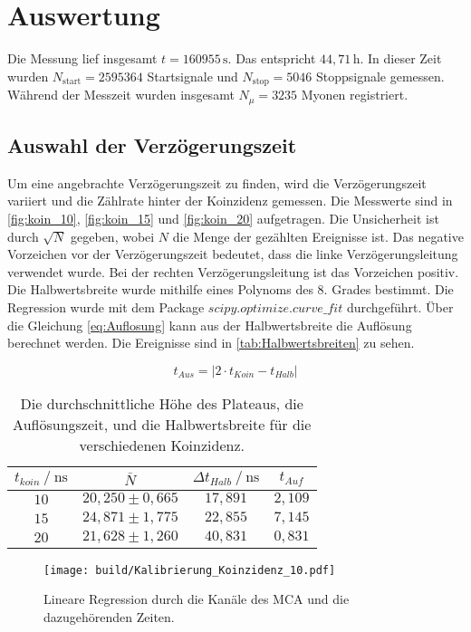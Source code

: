 \section{Auswertung}
\label{sec:auswertung}


Die Messung lief insgesamt $t = 160955 \, \unit{\second}$. Das entspricht $44,71 \, \unit{\hour}$. In dieser Zeit wurden $N_\text{start} = 2595364$ Startsignale und $N_\text{stop} = 5046$ Stoppsignale gemessen.
Während der Messzeit wurden insgesamt $N_{\mu} = 3235 $ Myonen registriert.

\subsection{Auswahl der Verzögerungszeit}
\label{sec:Verzögerungszeit}
Um eine angebrachte Verzögerungszeit zu finden, wird die Verzögerungszeit variiert und die Zählrate hinter der Koinzidenz gemessen.
Die Messwerte sind in \autoref{fig:koin_10}, \autoref{fig:koin_15} und \autoref{fig:koin_20} aufgetragen. Die Unsicherheit ist durch $ \sqrt{N}$ gegeben, wobei $N$ die Menge der gezählten Ereignisse ist.
Das negative Vorzeichen vor der Verzögerungszeit bedeutet, dass die linke Verzögerungsleitung verwendet wurde. Bei der rechten Verzögerungsleitung ist das Vorzeichen positiv.
Die Halbwertsbreite wurde mithilfe eines Polynoms des 8. Grades bestimmt. Die Regression wurde mit dem Package $scipy.optimize.curve\_ fit $  \cite{scipyop} durchgeführt.
Über die Gleichung \eqref{eq:Auflosung} kann aus der Halbwertsbreite die Auflösung berechnet werden. Die Ereignisse sind in \autoref{tab:Halbwertsbreiten} zu sehen.

\begin{equation}
    t_{Aus} = \left|2 \cdot t_{Koin} - t_{Halb} \right|
    \label{eq:Auflosung}
\end{equation}

\begin{table}[H]
    \centering
    \caption{Die durchschnittliche Höhe des Plateaus, die Auflösungszeit, und die Halbwertsbreite für die verschiedenen Koinzidenz.}
    \label{tab:Halbwertsbreiten}
    \begin{tabular}{c c c c}
    \toprule
     $t_{koin} \mathbin{/} \unit{\nano\second} $ &$\bar{N}$ & $\Delta t_{Halb} \mathbin{/} \unit{\nano\second}$ & $t_{Auf}$ \\
    \midrule
        $10$&  $20,250 \pm 0,665$ &  $17,891$ & $2,109$\\
        $15$&  $24,871 \pm 1,775$ &  $22,855$ & $7,145$\\
        $20$&  $21,628 \pm 1,260$ &  $40,831$ & $0,831$\\
    \bottomrule
    \end{tabular}
    \end{table}
\begin{figure}[H]
    \centering
    \texttt{[image: build/Kalibrierung\_Koinzidenz\_10.pdf]}
    \caption{Lineare Regression durch die Kanäle des MCA und die dazugehörenden Zeiten.}
    \label{fig:koin_10}
\end{figure}

